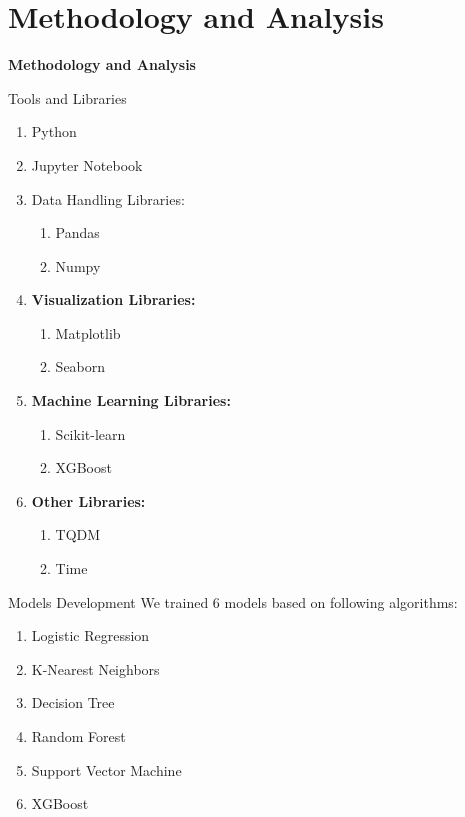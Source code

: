 \documentclass[14pt, aspectratio=169]{beamer}
\begin{document}
\section{Methodology and Analysis}
\begin{frame}{}
  \Huge
  \centering
  \textbf{Methodology and Analysis}
  \normalsize
\end{frame}
\begin{frame}{Tools and Libraries}
  \begin{multicols}{2}
  \begin{enumerate}
    \setlength\itemsep{.25em}
    \item Python
    \item Jupyter Notebook
    \scriptsize
      \item Data Handling Libraries:
          \begin{enumerate}
              \item Pandas
              \item Numpy
          \end{enumerate}
      \item{\textbf{Visualization Libraries: }}
          \begin{enumerate}
              \item Matplotlib
              \item Seaborn
          \end{enumerate}
      \item{\textbf{Machine Learning Libraries: }}
          \begin{enumerate}
              \item Scikit-learn
              \item XGBoost
          \end{enumerate}
      \item{\textbf{Other Libraries: }}
          \begin{enumerate}
              \item TQDM
              \item Time
          \end{enumerate}
  \end{enumerate}
\end{multicols}
\end{frame}
\begin{frame}{Models Development}
  We trained 6 models based on following algorithms:
  \begin{enumerate}
    \setlength\itemsep{.25em}
    \item Logistic Regression
    \item K-Nearest Neighbors
    \item Decision Tree
    \item Random Forest
    \item Support Vector Machine
    \item XGBoost
  \end{enumerate}
\end{frame}
\end{document}

